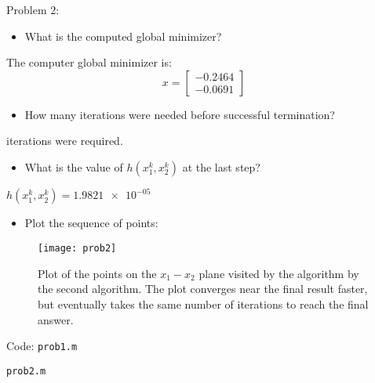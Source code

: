 \documentclass{article}
\begin{document}
\newpage
\noindent
{\large Problem 2:}
\begin{itemize}
	\item What is the computed global minimizer?
\end{itemize}
\qquad \qquad The computer global minimizer is:
\begin{equation*}
	x = \begin{bmatrix} -0.2464 \\ -0.0691 \end{bmatrix}
\end{equation*}
\begin{itemize}
	\item How many iterations were needed before successful termination?
\end{itemize}
\qquad {} iterations were required. 
\begin{itemize}
	\item What is the value of $h(x_1^k, x_2^k)$ at the last step?
\end{itemize}
\qquad \qquad $h(x_1^k, x_2^k) = \num{1.9821e-05}$
\begin{itemize}
	\item Plot the sequence of points:
\end{itemize}
\begin{figure}[H]
	\centering
	\texttt{[image: prob2]}
	\caption{Plot of the points on the $x_1 - x_2$ plane visited by the algorithm by the second algorithm. The plot converges near the final result faster, but eventually takes the same number of iterations to reach the final answer.}
\end{figure}

\newpage
\noindent
{\huge Code:} \newline
\texttt{prob1.m}

\newpage
\noindent
\texttt{prob2.m}

\end{document}
